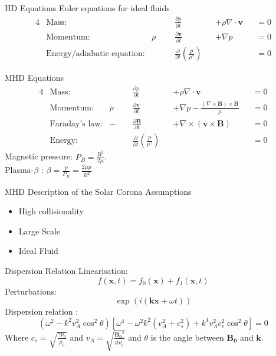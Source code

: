 \documentclass{beamer}
\begin{document}
\begin{frame}{HD Equations}
Euler equations for ideal fluids
\begin{alignat*}{4}
	&\text{Mass:} &\quad\quad &\frac{\partial \rho}{\partial t} & &+ \rho \nabla \cdot \mathbf v & &=  0 \\
	&\text{Momentum:} & \rho& \frac{\partial \mathbf v}{\partial t} & &+ \nabla p & &= 0\\
	&\text{Energy/adiabatic equation:} & &\frac{\partial }{\partial t} \left( \frac{p}{\rho^{\gamma}} \right)  & & & &= 0
\end{alignat*}
\end{frame}
\begin{frame}{MHD Equations}
    \begin{alignat*}{4}
	&\text{Mass:} &\quad\quad &\frac{\partial \rho}{\partial t} & & +\rho \nabla \cdot \mathbf v& &= 0 \\ 	
	&\text{Momentum:} & \rho& \frac{\partial \mathbf v}{\partial t} & &+ \nabla p - \frac{(\nabla \times \mathbf B) \times \mathbf B}{\mu}& &=  0  \\
	&\text{Faraday's law:} & -&\frac{\partial \mathbf B}{\partial t} & &+ \nabla \times (\mathbf v \times \mathbf B)& &= 0 \\
	&\text{Energy:} & &\frac{\partial }{\partial t} \left( \frac{p}{\rho^{\gamma}} \right)  & & & &= 0 
\end{alignat*}
Magnetic pressure: $P_B = \frac{B^2}{2\mu}$. \\Plasma-$\beta$ : $\beta = \frac{p}{P_B} = \frac{2\mu p}{B^2}$
\end{frame}
\begin{frame}{MHD Description of the Solar Corona}
    \centering
    Assumptions \cite{goedbloed2004principles}
    \begin{itemize}
        \item High collisionality
        \item Large Scale
        \item Ideal Fluid
    \end{itemize}
\end{frame}
\begin{frame}{Dispersion Relation}
    Linearisation:
        \begin{equation*}
            f(\mathbf{x},t) = f_0(\mathbf{x}) + f_1(\mathbf{x},t)
        \end{equation*}
    Perturbations:
        \begin{equation*}
            \exp(i(\mathbf{kx} + \omega t))
        \end{equation*}
	Dispersion relation \cite{Fitzpatricknotes}:
        \begin{equation*}
	        (\omega^2 - k^2 v_A^2 \cos^2 \theta)\left[ \omega^{4} - \omega^2k^2(v_A^2 + c_s^2) + k^{4}v_A^2c_s^2\cos^2\theta \right]  = 0
        \end{equation*}
        Where $c_s = \sqrt{\frac{\gamma p_0}{\rho_0}}$ and $v_A = \sqrt{\frac{\mathbf{B_0}^2}{\mu\rho_0}}$ and $\theta$ is the angle between $\mathbf{B_0}$ and $\mathbf{k}$.
\end{frame}
\end{document}
